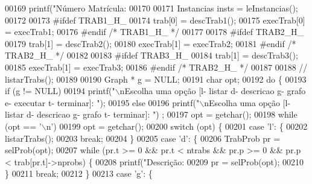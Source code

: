 \begin{DoxyCode}
{{{{{{{{{{{{{00169         printf(\textcolor{stringliteral}{"Número Matrícula: %
00170 
00171         Instancias insts = leInstancias();
00172 
00173 \textcolor{preprocessor}{#ifdef TRAB1\_H\_}
00174 trab[0] = descTrab1();
00175 execTrab[0] = execTrab1;
00176 \textcolor{preprocessor}{#endif }\textcolor{comment}{/* TRAB1\_H\_ */}\textcolor{preprocessor}{}
00177 
00178 \textcolor{preprocessor}{#ifdef TRAB2\_H\_}
00179 trab[1] = descTrab2();
00180 execTrab[1] = execTrab2;
00181 \textcolor{preprocessor}{#endif }\textcolor{comment}{/* TRAB2\_H\_ */}\textcolor{preprocessor}{}
00182 
00183 \textcolor{preprocessor}{#ifdef TRAB3\_H\_}
00184 trab[1] = descTrab3();
00185 execTrab[1] = execTrab3;
00186 \textcolor{preprocessor}{#endif }\textcolor{comment}{/* TRAB2\_H\_ */}\textcolor{preprocessor}{}
00187 
00188 \textcolor{comment}{//      listarTrabs();}
00189 
00190         Graph * g = NULL;
00191         \textcolor{keywordtype}{char} opt;
00192         \textcolor{keywordflow}{do} \{
00193                 \textcolor{keywordflow}{if} (g != NULL)
00194                         printf(\textcolor{stringliteral}{"\(\backslash\)nEscolha uma opção [l- listar   d- descricao   g- grafo   e- executar   t-
       terminar]: "});
00195                 \textcolor{keywordflow}{else}
00196                         printf(\textcolor{stringliteral}{"\(\backslash\)nEscolha uma opção [l- listar   d- descricao   g- grafo   t- terminar]: "})
      ;
00197                 opt = getchar();
00198                 \textcolor{keywordflow}{while} (opt == \textcolor{charliteral}{'\(\backslash\)n'})
00199                         opt = getchar();
00200                 \textcolor{keywordflow}{switch} (opt) \{
00201                 \textcolor{keywordflow}{case} \textcolor{charliteral}{'l'}: \{
00202                         listarTrabs();
00203                         \textcolor{keywordflow}{break};
00204                 \}
00205                 \textcolor{keywordflow}{case} \textcolor{charliteral}{'d'}: \{
00206                         TrabProb pr = selProb(opt);
00207                         \textcolor{keywordflow}{while} (pr.t >= 0 && pr.t < ntrabs && pr.p >= 0 && pr.p < trab[pr.t]->nprobs) \{
00208                                 printf(\textcolor{stringliteral}{"Descrição: %
00209                                 pr = selProb(opt);
00210                         \}
00211                         \textcolor{keywordflow}{break};
00212                 \}
00213                 \textcolor{keywordflow}{case} \textcolor{charliteral}{'g'}: \{
}}}}}}}}}}}}}}}
\end{DoxyCode}
